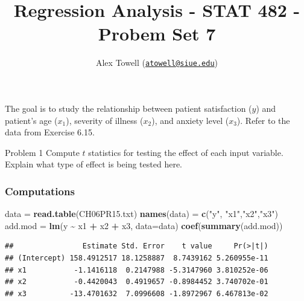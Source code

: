 \documentclass[
]{article}
\title{Regression Analysis - STAT 482 - Probem Set 7}
\author{Alex Towell
(\href{mailto:atowell@siue.edu}{\nolinkurl{atowell@siue.edu}})}
\date{}
\newenvironment{Shaded}{\begin{snugshade}}{\end{snugshade}}
\newcommand{\AttributeTok}[1]{\textcolor[rgb]{0.13,0.29,0.53}{#1}}
\newcommand{\FunctionTok}[1]{\textcolor[rgb]{0.13,0.29,0.53}{\textbf{#1}}}
\newcommand{\NormalTok}[1]{#1}
\newcommand{\OtherTok}[1]{\textcolor[rgb]{0.56,0.35,0.01}{#1}}
\newcommand{\SpecialCharTok}[1]{\textcolor[rgb]{0.81,0.36,0.00}{\textbf{#1}}}
\newcommand{\StringTok}[1]{\textcolor[rgb]{0.31,0.60,0.02}{#1}}
\begin{document}
\maketitle

\newcommand{\sos}[1]{\mathrm{SS_{#1}}}
\newcommand{\ms}[1]{\mathrm{MS_{#1}}}
\newcommand{\sd}{\operatorname{sd}}
\newcommand{\var}{\operatorname{var}}
\newcommand{\expect}{\operatorname{E}}
\newcommand{\corr}{\operatorname{cor}}
\newcommand{\cov}{\operatorname{cov}}
\newcommand{\se}{\operatorname{se}}
\newcommand{\eval}[2]{\left. #1 \right\vert_{#2}}
\newcommand{\degf}[1]{\mathrm{df_{#1}}}
\newcommand{\entropy}{\operatorname{H}}

The goal is to study the relationship between patient satisfaction
(\(y\)) and patient's age (\(x_1\)), severity of illness (\(x_2\)), and
anxiety level (\(x_3\)). Refer to the data from Exercise 6.15.

\begin{tcolorbox}[split=\f]
Problem 1
\tcblower
Compute $t$ statistics for testing the effect of each input variable.
Explain what type of effect is being tested here.
\end{tcolorbox}

\hypertarget{computations}{%
\subsubsection{Computations}\label{computations}}

\begin{Shaded}
\begin{Highlighting}[]
\NormalTok{data }\OtherTok{=} \FunctionTok{read.table}\NormalTok{(}\StringTok{\textquotesingle{}CH06PR15.txt\textquotesingle{}}\NormalTok{)}
\FunctionTok{names}\NormalTok{(data) }\OtherTok{=} \FunctionTok{c}\NormalTok{(}\StringTok{"y"}\NormalTok{, }\StringTok{"x1"}\NormalTok{,}\StringTok{"x2"}\NormalTok{,}\StringTok{"x3"}\NormalTok{)}
\NormalTok{add.mod }\OtherTok{=} \FunctionTok{lm}\NormalTok{(y }\SpecialCharTok{\textasciitilde{}}\NormalTok{ x1 }\SpecialCharTok{+}\NormalTok{ x2 }\SpecialCharTok{+}\NormalTok{ x3, }\AttributeTok{data=}\NormalTok{data)}
\FunctionTok{coef}\NormalTok{(}\FunctionTok{summary}\NormalTok{(add.mod))}
\end{Highlighting}
\end{Shaded}

\begin{verbatim}
##                Estimate Std. Error    t value     Pr(>|t|)
## (Intercept) 158.4912517 18.1258887  8.7439162 5.260955e-11
## x1           -1.1416118  0.2147988 -5.3147960 3.810252e-06
## x2           -0.4420043  0.4919657 -0.8984452 3.740702e-01
## x3          -13.4701632  7.0996608 -1.8972967 6.467813e-02
\end{verbatim}
\end{document}
